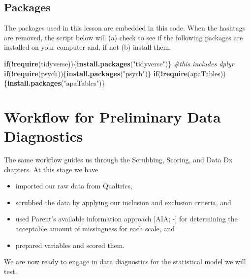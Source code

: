 \documentclass[
  11pt,
]{book}
\newenvironment{Shaded}{\begin{snugshade}}{\end{snugshade}}
\newcommand{\CommentTok}[1]{\textcolor[rgb]{0.37,0.37,0.37}{\textit{#1}}}
\newcommand{\ControlFlowTok}[1]{\textcolor[rgb]{0.27,0.27,0.27}{\textbf{#1}}}
\newcommand{\FunctionTok}[1]{\textcolor[rgb]{0.27,0.27,0.27}{\textbf{#1}}}
\newcommand{\NormalTok}[1]{#1}
\newcommand{\SpecialCharTok}[1]{\textcolor[rgb]{0.43,0.43,0.43}{\textbf{#1}}}
\newcommand{\StringTok}[1]{\textcolor[rgb]{0.5,0.5,0.5}{#1}}
\providecommand{\tightlist}{%
  \setlength{\itemsep}{0pt}\setlength{\parskip}{0pt}}
\begin{document}
\hypertarget{packages-2}{%
\subsection{Packages}\label{packages-2}}

The packages used in this lesson are embedded in this code. When the hashtags are removed, the script below will (a) check to see if the following packages are installed on your computer and, if not (b) install them.

\begin{Shaded}
\begin{Highlighting}[]
\ControlFlowTok{if}\NormalTok{(}\SpecialCharTok{!}\FunctionTok{require}\NormalTok{(tidyverse))\{}\FunctionTok{install.packages}\NormalTok{(}\StringTok{"tidyverse"}\NormalTok{)\} }\CommentTok{\#this includes dplyr}
\ControlFlowTok{if}\NormalTok{(}\SpecialCharTok{!}\FunctionTok{require}\NormalTok{(psych))\{}\FunctionTok{install.packages}\NormalTok{(}\StringTok{"psych"}\NormalTok{)\}}
\ControlFlowTok{if}\NormalTok{(}\SpecialCharTok{!}\FunctionTok{require}\NormalTok{(apaTables))\{}\FunctionTok{install.packages}\NormalTok{(}\StringTok{"apaTables"}\NormalTok{)\}}
\end{Highlighting}
\end{Shaded}

\hypertarget{workflow-for-preliminary-data-diagnostics}{%
\section{Workflow for Preliminary Data Diagnostics}\label{workflow-for-preliminary-data-diagnostics}}

The same workflow guides us through the Scrubbing, Scoring, and Data Dx chapters. At this stage we have

\begin{itemize}
\tightlist
\item
  imported our raw data from Qualtrics,
\item
  scrubbed the data by applying our inclusion and exclusion criteria, and
\item
  used Parent's available information approach {[}AIA; -\citet{parent_handling_2013}{]} for determining the acceptable amount of missingness for each scale, and
\item
  prepared variables and scored them.
\end{itemize}

We are now ready to engage in data diagnostics for the statistical model we will test.
\end{document}

